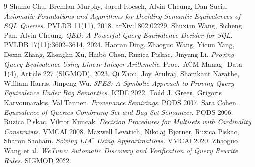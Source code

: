 \documentclass[11pt,a4paper]{article}
\theoremstyle{definition}
\theoremstyle{plain}
\theoremstyle{remark}
\begin{document}
\begin{thebibliography}{9}
 Shumo Chu, Brendan Murphy, Jared Roesch, Alvin Cheung, Dan Suciu.
  \emph{Axiomatic Foundations and Algorithms for Deciding Semantic Equivalences of SQL Queries.}
  PVLDB 11(11), 2018. arXiv:1802.02229.
 Shuxian Wang, Sicheng Pan, Alvin Cheung.
  \emph{QED: A Powerful Query Equivalence Decider for SQL.} PVLDB 17(11):3602--3614, 2024.
 Haoran Ding, Zhaoguo Wang, Yicun Yang, Dexin Zhang, Zhenglin Xu,
  Haibo Chen, Ruzica Piskac, Jinyang Li.
  \emph{Proving Query Equivalence Using Linear Integer Arithmetic.}
  Proc.\ ACM Manag.\ Data 1(4), Article 227 (SIGMOD), 2023.
 Qi Zhou, Joy Arulraj, Shamkant Navathe, William Harris, Jinpeng Wu.
  \emph{SPES: A Symbolic Approach to Proving Query Equivalence Under Bag Semantics.} ICDE 2022.
 Todd J. Green, Grigoris Karvounarakis, Val Tannen.
  \emph{Provenance Semirings.} PODS 2007.
 Sara Cohen. \emph{Equivalence of Queries Combining Set and Bag-Set Semantics.}
  PODS 2006.
 Ruzica Piskac, Viktor Kuncak.
  \emph{Decision Procedures for Multisets with Cardinality Constraints.} VMCAI 2008.
 Maxwell Levatich, Nikolaj Bj\o{}rner, Ruzica Piskac, Sharon Shoham.
  \emph{Solving LIA$^*$ Using Approximations.} VMCAI 2020.
 Zhaoguo Wang et al. \emph{WeTune: Automatic Discovery and Verification of
  Query Rewrite Rules.} SIGMOD 2022.
\end{thebibliography}
\end{document}
